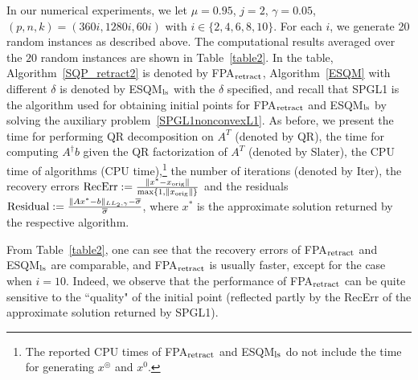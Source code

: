 \documentclass[10pt]{article}
\numberwithin{equation}{section}
\def\xorig{{x_{\rm orig}}}
\def\xfeasss{x^\circledcirc}
\begin{document}
In our numerical experiments, we let $\mu =0.95$, $j = 2$, $\gamma = 0.05$, {\color{blue} $(p,n,k) = (360i,1280i,60i)$ }with $i\in \{2, 4, 6, 8, 10\}$. For each $i$, we generate {\color{blue}20 random instances} as described above. The computational results averaged over the {\color{blue} $20$ random instances} are shown in Table~\ref{table2}. In the table, Algorithm~\ref{SQP_retract2} is denoted by FPA$_{\rm retract}$, Algorithm~\ref{ESQM} with different $\delta$ is denoted by ESQM$_{\rm ls}$ with the $\delta$ specified, and recall that SPGL1 is the algorithm used for obtaining initial points for FPA$_{\rm retract}$ and ESQM$_{\rm ls}$ by solving the auxiliary problem~\eqref{SPGL1nonconvexL1}. As before, we present the time for performing QR decomposition on $A^T$ (denoted by QR), the time for computing $A^\dagger b$ given the QR factorization of $A^T$ (denoted by Slater), the CPU time of algorithms (CPU time),\footnote{The reported CPU times of FPA$_{\rm retract}$ and ESQM$_{\rm ls}$ do not include the time for generating $\xfeasss$ and $x^0$.} the number of iterations (denoted by Iter), the recovery errors $\text{RecErr} := \frac{\|x^* - \xorig\|}{\max\{1, \|\xorig\|\}}$ and the residuals ${\rm Residual} := \frac{\|Ax^* - b\|_{LL_2,\gamma} - \overline{\sigma} }{\overline{\sigma}}$, where $x^*$ is the approximate solution returned by the respective algorithm.

From Table~\ref{table2}, one can see that the recovery errors of FPA$_{\rm retract}$ and ESQM$_{\rm ls}$ are comparable, and FPA$_{\rm retract}$ is usually faster, except for the case when $i = 10$.
Indeed, we observe that the performance of FPA$_{\rm retract}$ can be quite sensitive to the ``quality" of the initial point (reflected partly by the RecErr of the approximate solution returned by SPGL1).

\end{document}
